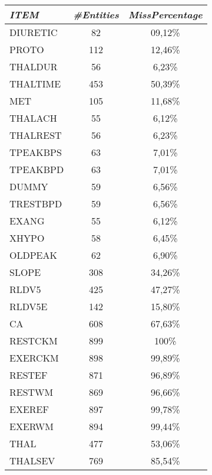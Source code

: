 \documentclass[a4paper,12pt]{article}
\begin{document}
\begin{multicols}{2}
\begin{tabular}{|l|c|c|}
            \end{tabular}
            \begin{tabular}{|l|c|c|} \hline

                \textit{ITEM} 	& \textit{\#Entities}	& \textit{MissPercentage} \\
                \hline DIURETIC	& 	82	&	09,12\% \\
                \hline PROTO	&	112		&	12,46\% \\
                \hline THALDUR	&	56		&	6,23\% \\
                \hline THALTIME	&	453		&	50,39\% \\
                \hline MET		& 	105		&	11,68\% \\
                \hline THALACH	&	55		&	6,12\% \\
                \hline THALREST	&	56		&	6,23\% \\
                \hline TPEAKBPS	&	63		&	7,01\% \\
                \hline TPEAKBPD	&	63		&	7,01\% \\
                \hline DUMMY	&	59		&	6,56\% \\
                \hline TRESTBPD	&	59		&	6,56\% \\
                \hline EXANG	&	55		&	6,12\% \\
                \hline XHYPO	&	58		&	6,45\% \\
                \hline OLDPEAK	&	62		&	6,90\% \\
                \hline SLOPE	&	308		&	34,26\% \\
                \hline RLDV5	&	425		&	47,27\% \\
                \hline RLDV5E	&	142		&	15,80\% \\
                \hline CA		&	608		&	67,63\% \\
                \hline RESTCKM	&	899		&	100\% \\
                \hline EXERCKM	&	898		&	99,89\% \\
                \hline RESTEF	&	871		&	96,89\% \\
                \hline RESTWM	&	869		&	96,66\% \\
                \hline EXEREF	&	897		&	99,78\% \\
                \hline EXERWM	&	894		&	99,44\% \\
                \hline THAL		&	477		&	53,06\% \\
                \hline THALSEV	&	769		&	85,54\% \\ \hline


            \end{tabular}

        \end{multicols}
\end{document}
